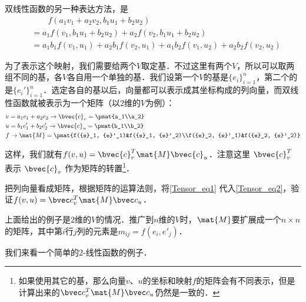 双线性函数的另一种表达方法，是
\begin{equation}\label{Tensor_eq2}
\begin{aligned}
&\qquad f(a_1{v}_1+a_2{v}_2, b_1{u}_1+b_2{u}_2)\\
&=a_1f({v}_1, b_1{u}_1+b_2{u}_2)+a_2f({v}_2, b_1{u}_1+b_2{u}_2)\\
&=a_1b_1f({v}_1, {u}_1)+a_2b_1f({v}_2, {u}_1)+a_1b_2f({v}_1, {u}_2)+a_2b_2f({v}_2, {u}_2)
\end{aligned}
\end{equation}

为了表示这个映射，我们需要给两个$V$取定基．不过这里有两个$V$，所以可以取两组不同的基，各$V$各自用一个单独的基．我们设第一个$V$的基是$\{{e}_i\}^n_{i=1}$，第二个的是$\{{e}_i'\}^n_{i=1}$．选定各自的基以后，向量都可以表示成其坐标构成的列向量，而双线性函数就被表示为一个矩阵（以$2$维的$V$为例）：
\begin{equation}\label{Tensor_eq1}
\begin{aligned}
&{v}=a_1{e}_1+a_2{e}_2\rightarrow   \bvec{c}_v =\pmat{a_1\\a_2}\\
&{u}=b_1{e}'_1+b_2{e}'_2\rightarrow  \bvec{c}_u =\pmat{b_1\\b_2}\\
&f\rightarrow \mat{M}=\pmat{f({e}_1, {e}'_1)&f({e}_1, {e}'_2)\\f({e}_2, {e}'_1)&f({e}_2, {e}'_2)}\\
\end{aligned}
\end{equation}

这样，我们就有$f({v}, {u})=  \bvec{c}_v^T \mat{M} \bvec{c}_u$．注意这里 $\bvec{c}_v^T$ 表示 $ \bvec{c}_v$ 作为矩阵的转置\footnote{如果使用其它的基，那么向量${v}$、${u}$的坐标和映射$f$的矩阵会有不同表示，但是计算出来的$ \bvec c_v^T\mat{M}  \bvec c_u$仍然是一致的．}．

\begin{exercise}{}
把列向量看成矩阵，根据矩阵的运算法则，将\autoref{Tensor_eq1} 代入\autoref{Tensor_eq2}，验证$f({v}, {u})=  \bvec c_v^T\mat{M}  \bvec c_u$．
\end{exercise}

上面给出的例子是$2$维的$V$的情况．推广到$n$维的$V$时，$\mat{M}$要扩展成一个$n\times n$的矩阵，其中第$i$行$j$列的元素是$m_{ij}=f({e}_i, {e}'_j)$．

我们来看一个简单的$2$-线性函数的例子．

